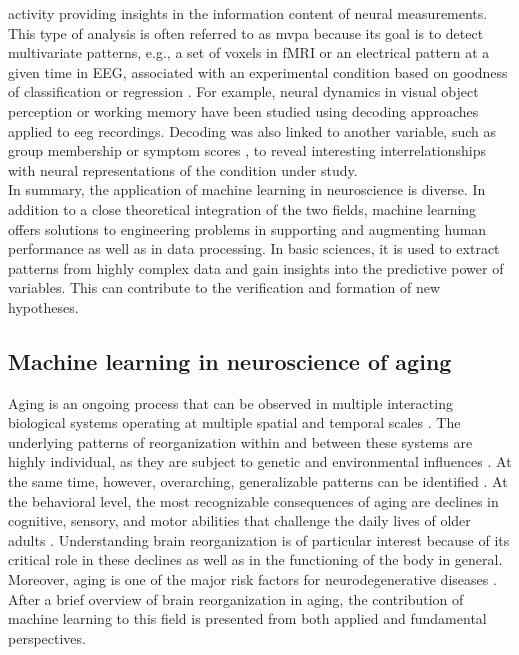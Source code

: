 activity providing insights in the information content of neural measurements. This type of analysis is often referred to as \gls{mvpa} because its goal is to detect multivariate patterns, e.g., a set of voxels in fMRI or an electrical pattern at a given time in EEG, associated with an experimental condition based on goodness of classification or regression \cite{Holdgraf2017}. For example, neural dynamics in visual object perception \cite{Cauchoix2014} or working memory \cite{Bae2018} have been studied using decoding approaches applied to \gls{eeg} recordings. Decoding was also linked to another variable, such as group membership \cite{Csizmadia2021, Bae2020} or symptom scores \cite{Coutanche2011} , to reveal interesting interrelationships with neural representations of the condition under study.\\
In summary, the application of machine learning in neuroscience is diverse. In addition to a close theoretical integration of the two fields, machine learning offers solutions to engineering problems in supporting and augmenting human performance as well as in data processing. In basic sciences, it is used to extract patterns from highly complex data and gain insights into the predictive power of variables. This can contribute to the verification and formation of new hypotheses.

\subsection{Machine learning in neuroscience of aging}
Aging is an ongoing process that can be observed in multiple interacting biological systems operating at multiple spatial and temporal scales \cite{Mooney2016}. The underlying patterns of reorganization within and between these systems are highly individual, as they are subject to genetic and environmental influences \cite{Smith2020, Mooney2016}. At the same time, however, overarching, generalizable patterns can be identified \cite{Salthouse2019}. At the behavioral level, the most recognizable consequences of aging are declines in cognitive, sensory, and motor abilities that challenge the daily lives of older adults \cite{Li2002}. Understanding brain reorganization is of particular interest because of its critical role in these declines as well as in the functioning of the body in general. Moreover, aging is one of the major risk factors for neurodegenerative diseases \cite{Hou2019}. After a brief overview of brain reorganization in aging, the contribution of machine learning to this field is presented from both applied and fundamental perspectives.

